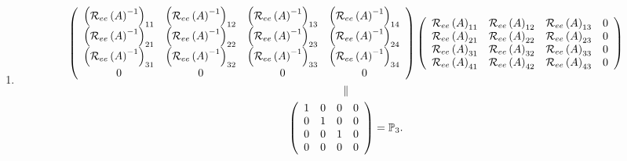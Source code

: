 \documentclass[aps,preprint]{revtex4}%
\begin{document}
\begin{enumerate}
\begin{enumerate}
\item
\begin{gather}
\left(
\begin{array}
[c]{cccc}%
\left(  \mathcal{R}_{ee}\left(  A\right)  ^{-1}\right)  _{11} & \left(
\mathcal{R}_{ee}\left(  A\right)  ^{-1}\right)  _{12} & \left(  \mathcal{R}%
_{ee}\left(  A\right)  ^{-1}\right)  _{13} & \left(  \mathcal{R}_{ee}\left(
A\right)  ^{-1}\right)  _{14}\\
\left(  \mathcal{R}_{ee}\left(  A\right)  ^{-1}\right)  _{21} & \left(
\mathcal{R}_{ee}\left(  A\right)  ^{-1}\right)  _{22} & \left(  \mathcal{R}%
_{ee}\left(  A\right)  ^{-1}\right)  _{23} & \left(  \mathcal{R}_{ee}\left(
A\right)  ^{-1}\right)  _{24}\\
\left(  \mathcal{R}_{ee}\left(  A\right)  ^{-1}\right)  _{31} & \left(
\mathcal{R}_{ee}\left(  A\right)  ^{-1}\right)  _{32} & \left(  \mathcal{R}%
_{ee}\left(  A\right)  ^{-1}\right)  _{33} & \left(  \mathcal{R}_{ee}\left(
A\right)  ^{-1}\right)  _{34}\\
0 & 0 & 0 & 0
\end{array}
\right)  \left(
\begin{array}
[c]{ccc}%
\mathcal{R}_{ee}\left(  A\right)  _{11} & \mathcal{R}_{ee}\left(  A\right)
_{12} & \mathcal{R}_{ee}\left(  A\right)  _{13}\\
\mathcal{R}_{ee}\left(  A\right)  _{21} & \mathcal{R}_{ee}\left(  A\right)
_{22} & \mathcal{R}_{ee}\left(  A\right)  _{23}\\
\mathcal{R}_{ee}\left(  A\right)  _{31} & \mathcal{R}_{ee}\left(  A\right)
_{32} & \mathcal{R}_{ee}\left(  A\right)  _{33}\\
\mathcal{R}_{ee}\left(  A\right)  _{41} & \mathcal{R}_{ee}\left(  A\right)
_{42} & \mathcal{R}_{ee}\left(  A\right)  _{43}%
\end{array}%
\begin{array}
[c]{c}%
0\\
0\\
0\\
0
\end{array}
\right) \\
\parallel\\
\left(
\begin{array}
[c]{cccc}%
1 & 0 & 0 & 0\\
0 & 1 & 0 & 0\\
0 & 0 & 1 & 0\\
0 & 0 & 0 & 0
\end{array}
\right)  =\mathbb{P}_{3}.
\end{gather}



\end{enumerate}
\end{enumerate}
\end{document}
